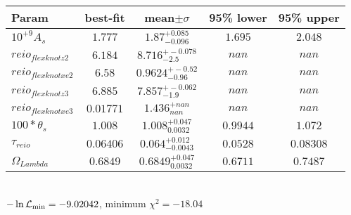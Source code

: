 \begin{tabular}{|l|c|c|c|c|} 
 \hline 
Param & best-fit & mean$\pm\sigma$ & 95\% lower & 95\% upper \\ \hline 
$10^{+9}A_{s }$ &$1.777$ & $1.87_{-0.096}^{+0.085}$ & $1.695$ & $2.048$ \\ 
$reio_{flexknot z  2 }$ &$6.184$ & $8.716_{-2.5}^{+-0.078}$ & $nan$ & $nan$ \\ 
$reio_{flexknot xe  2 }$ &$6.58$ & $0.9624_{-0.96}^{+-0.52}$ & $nan$ & $nan$ \\ 
$reio_{flexknot z  3 }$ &$6.885$ & $7.857_{-1.9}^{+-0.062}$ & $nan$ & $nan$ \\ 
$reio_{flexknot xe  3 }$ &$0.01771$ & $1.436_{nan}^{+nan}$ & $nan$ & $nan$ \\ 
$100*\theta{}_{s }$ &$1.008$ & $1.008_{0.0032}^{+0.047}$ & $0.9944$ & $1.072$ \\ 
$\tau{}_{reio }$ &$0.06406$ & $0.064_{-0.0043}^{+0.012}$ & $0.0528$ & $0.08308$ \\ 
$\Omega{}_{Lambda }$ &$0.6849$ & $0.6849_{0.0032}^{+0.047}$ & $0.6711$ & $0.7487$ \\ 
\hline 
 \end{tabular} \\ 
$-\ln{\cal L}_\mathrm{min} =-9.02042$, minimum $\chi^2=-18.04$ \\ 
